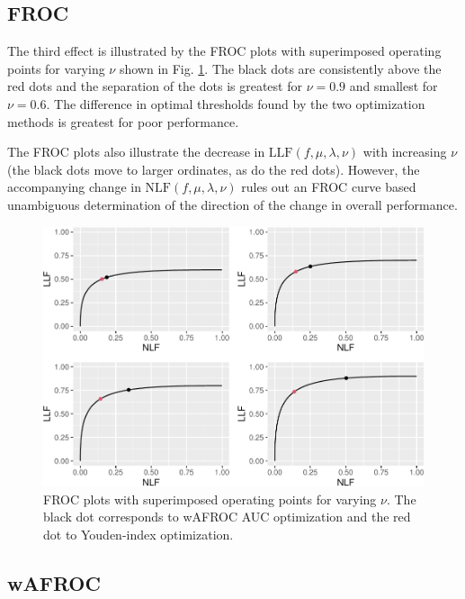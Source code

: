 \documentclass[
]{book}
\begin{document}
\hypertarget{froc-3}{%
\subsection{FROC}\label{froc-3}}

The third effect is illustrated by the FROC plots with superimposed operating points for varying \(\nu\) shown in Fig. \ref{fig:optim-op-point-vary-nu-froc}. The black dots are consistently above the red dots and the separation of the dots is greatest for \(\nu = 0.9\) and smallest for \(\nu = 0.6\). The difference in optimal thresholds found by the two optimization methods is greatest for poor performance.

The FROC plots also illustrate the decrease in \(\text{LLF} \left ( f, \mu, \lambda, \nu \right )\) with increasing \(\nu\) (the black dots move to larger ordinates, as do the red dots). However, the accompanying change in \(\text{NLF} \left ( f, \mu, \lambda, \nu \right )\) rules out an FROC curve based unambiguous determination of the direction of the change in overall performance.

\begin{figure}
\centering
\includegraphics{22-optim-op-point_files/figure-latex/optim-op-point-vary-nu-froc-1.pdf}
\caption{\label{fig:optim-op-point-vary-nu-froc}FROC plots with superimposed operating points for varying \(\nu\). The black dot corresponds to wAFROC AUC optimization and the red dot to Youden-index optimization.}
\end{figure}

\hypertarget{wafroc-3}{%
\subsection{wAFROC}\label{wafroc-3}}
\end{document}
